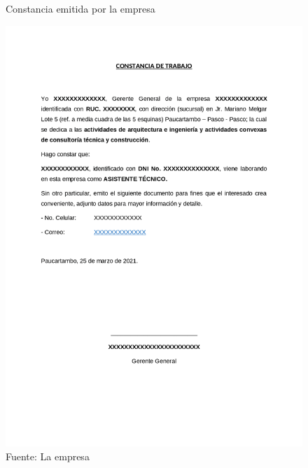 \begin{figure}[H]
  \centering
  \caption[]{Constancia emitida por la empresa}
  \includegraphics[width=1\linewidth]{E_IMAGENES/Anexos/Constancia_investigacion.png}
  \caption*{Fuente: La empresa}
  \label{fig:Anexo_C}
\end{figure}
